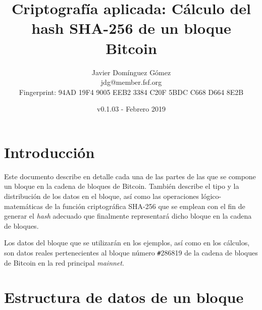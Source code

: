 \documentclass{article}
\title{\textbf{Criptografía aplicada: Cálculo del hash SHA-256 de un bloque Bitcoin}}
\author{Javier Domínguez Gómez \\
\small{jdg@member.fsf.org} \\
\small{Fingerprint: 94AD 19F4 9005 EEB2 3384 C20F 5BDC C668 D664 8E2B}}
\date{v0.1.03 - Febrero 2019}
\begin{document}
\maketitle

\tableofcontents{}

\section{Introducción}
    Este documento describe en detalle cada una de las partes de las que se compone un bloque en la cadena de bloques de Bitcoin. También describe el tipo y la distribución de los datos en el bloque, así como las operaciones lógico-matemáticas de la función criptográfica SHA-256 que se emplean con el fin de generar el \textit{hash} adecuado que finalmente representará dicho bloque en la cadena de bloques.
    
    Los datos del bloque que se utilizarán en los ejemplos, así como en los cálculos, son datos reales pertenecientes al bloque número \texttt{\#}286819 de la cadena de bloques de Bitcoin en la red principal \textit{mainnet}.

\section{Estructura de datos de un bloque}
    
    \vspace{3mm}
    
\end{document}
